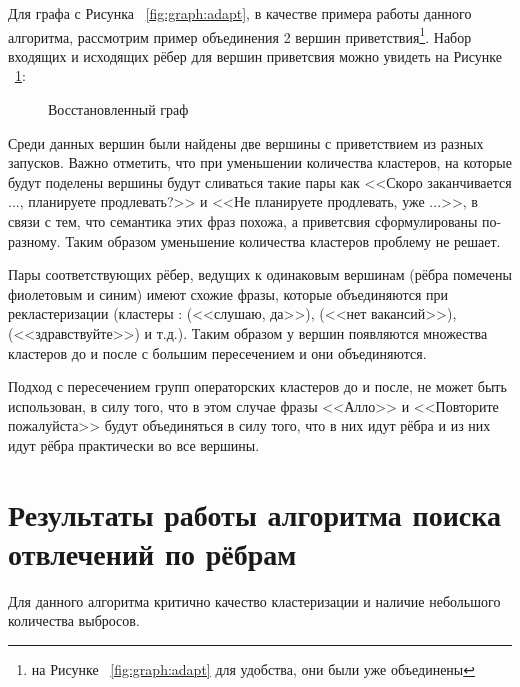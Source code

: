 \documentclass[times,specification,annotation]{itmo-student-thesis}
\begin{document}
	Для графа с Рисунка ~\ref{fig:graph:adapt}, в качестве примера работы данного алгоритма, рассмотрим пример объединения 2 вершин приветствия\footnote{на Рисунке ~\ref{fig:graph:adapt} для удобства, они были уже объединены}. Набор входящих и исходящих рёбер для вершин приветсвия можно увидеть на Рисунке ~\ref{fig:adapt:graph:merge}:
	
	\begin{figure}[H]
		\caption{Восстановленный граф}
		\label{fig:adapt:graph:merge}
	\end{figure}

	Среди данных вершин были найдены две вершины с приветствием из разных запусков. Важно отметить, что при уменьшении количества кластеров, на которые будут поделены вершины будут сливаться такие пары как <<Скоро заканчивается ..., планируете продлевать?>> и <<Не планируете продлевать, уже ...>>, в связи с тем, что семантика этих фраз похожа, а приветсвия сформулированы по-разному. Таким образом уменьшение количества кластеров проблему не решает.
	
	Пары соответствующих рёбер, ведущих к одинаковым вершинам (рёбра помечены фиолетовым и синим) имеют схожие фразы, которые объединяются при рекластеризации (кластеры : (<<слушаю, да>>), (<<нет вакансий>>), (<<здравствуйте>>) и т.д.). Таким образом у вершин появляются множества кластеров до и после с большим пересечением и они объединяются.
	
	Подход с пересечением групп операторских кластеров  до и после, не может быть использован, в силу того, что в этом случае фразы <<Алло>> и <<Повторите пожалуйста>> будут объединяться в силу того, что в них идут рёбра и из них идут рёбра практически во все вершины.
	
	\section{Результаты работы алгоритма поиска отвлечений по рёбрам}
	Для данного алгоритма критично качество кластеризации и наличие небольшого количества выбросов. 
		
\end{document}
